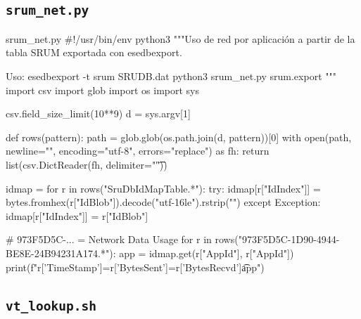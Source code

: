 \documentclass[11pt,a4paper]{article}
\begin{document}
\subsection{\texttt{srum\_net.py}}
\begin{codigopython}{srum\_net.py}
#!/usr/bin/env python3
"""Uso de red por aplicación a partir de la tabla SRUM exportada con esedbexport.

Uso:
  esedbexport -t srum SRUDB.dat
  python3 srum_net.py srum.export
"""
import csv
import glob
import os
import sys

csv.field_size_limit(10**9)
d = sys.argv[1]

def rows(pattern):
    path = glob.glob(os.path.join(d, pattern))[0]
    with open(path, newline="", encoding="utf-8", errors="replace") as fh:
        return list(csv.DictReader(fh, delimiter="\t"))

idmap = {}
for r in rows("SruDbIdMapTable.*"):
    try:
        idmap[r["IdIndex"]] = bytes.fromhex(r["IdBlob"]).decode("utf-16le").rstrip("")
    except Exception:
        idmap[r["IdIndex"]] = r["IdBlob"]

# {973F5D5C-...} = Network Data Usage
for r in rows("{973F5D5C-1D90-4944-BE8E-24B94231A174}.*"):
    app = idmap.get(r["AppId"], r["AppId"])
    print(f"{r['TimeStamp']}\tsent={r['BytesSent']}\trecv={r['BytesRecvd']}\t{app}")
\end{codigopython}
\subsection{\texttt{vt\_lookup.sh}}
\end{document}
